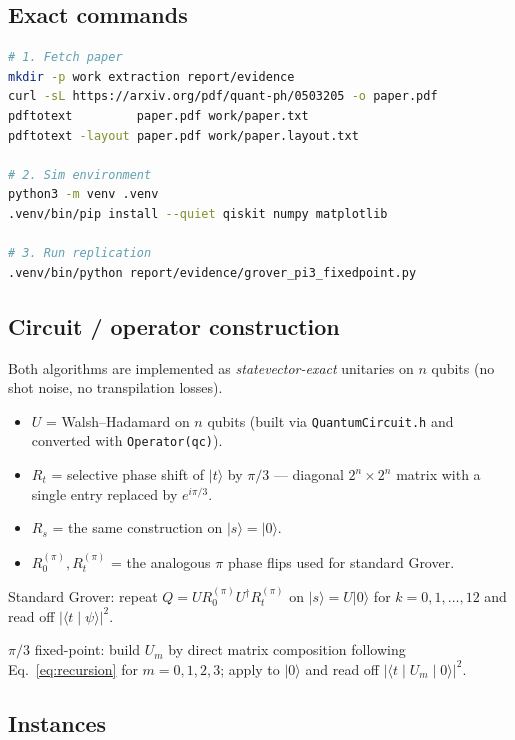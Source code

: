 \documentclass[11pt]{article}
\begin{document}
\subsection{Exact commands}

\begin{lstlisting}[language=bash]
# 1. Fetch paper
mkdir -p work extraction report/evidence
curl -sL https://arxiv.org/pdf/quant-ph/0503205 -o paper.pdf
pdftotext         paper.pdf work/paper.txt
pdftotext -layout paper.pdf work/paper.layout.txt

# 2. Sim environment
python3 -m venv .venv
.venv/bin/pip install --quiet qiskit numpy matplotlib

# 3. Run replication
.venv/bin/python report/evidence/grover_pi3_fixedpoint.py
\end{lstlisting}

\subsection{Circuit / operator construction}

Both algorithms are implemented as \emph{statevector-exact} unitaries on
$n$ qubits (no shot noise, no transpilation losses).

\begin{itemize}
  \item $U$ = Walsh--Hadamard on $n$ qubits (built via
        \texttt{QuantumCircuit.h} and converted with
        \texttt{Operator(qc)}).
  \item $R_t$ = selective phase shift of $\lvert t\rangle$ by $\pi/3$ ---
        diagonal $2^n\!\times\!2^n$ matrix with a single entry replaced
        by $e^{i\pi/3}$.
  \item $R_s$ = the same construction on $\lvert s\rangle = \lvert 0\rangle$.
  \item $R_0^{(\pi)}, R_t^{(\pi)}$ = the analogous $\pi$ phase flips used
        for standard Grover.
\end{itemize}

Standard Grover: repeat $Q = U R_0^{(\pi)} U^{\dagger} R_t^{(\pi)}$ on
$\lvert s\rangle = U \lvert 0\rangle$ for $k = 0, 1, \dots, 12$ and read
off $|\langle t \mid \psi\rangle|^{2}$.

$\pi/3$ fixed-point: build $U_m$ by direct matrix composition following
Eq.~\eqref{eq:recursion} for $m = 0, 1, 2, 3$; apply to $\lvert 0\rangle$
and read off $|\langle t \mid U_m \mid 0\rangle|^{2}$.

\subsection{Instances}
\end{document}
